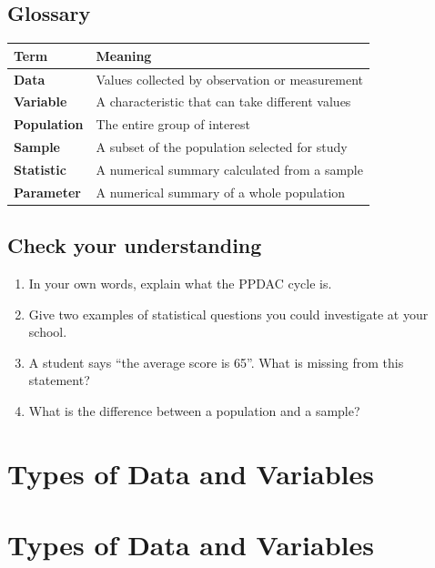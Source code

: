 \documentclass[
  11pt,
  a4paper,
  oneside,
  open=any]{scrbook}
\providecommand{\tightlist}{%
  \setlength{\itemsep}{0pt}\setlength{\parskip}{0pt}}
\begin{document}
\section{Glossary}\label{glossary}

\begin{longtable}[]{@{}ll@{}}
\toprule\noalign{}
Term & Meaning \\
\midrule\noalign{}
\endhead
\bottomrule\noalign{}
\endlastfoot
\textbf{Data} & Values collected by observation or measurement \\
\textbf{Variable} & A characteristic that can take different values \\
\textbf{Population} & The entire group of interest \\
\textbf{Sample} & A subset of the population selected for study \\
\textbf{Statistic} & A numerical summary calculated from a sample \\
\textbf{Parameter} & A numerical summary of a whole population \\
\end{longtable}

\section{Check your understanding}\label{check-your-understanding}

\begin{enumerate}
\def\labelenumi{\arabic{enumi}.}
\tightlist
\item
  In your own words, explain what the PPDAC cycle is.
\item
  Give two examples of statistical questions you could investigate at
  your school.
\item
  A student says ``the average score is 65''. What is missing from this
  statement?
\item
  What is the difference between a population and a sample?
\end{enumerate}


\chapter{Types of Data and Variables}\label{types-of-data-and-variables}


\chapter{Types of Data and Variables}\label{sec-data-types}
\end{document}
